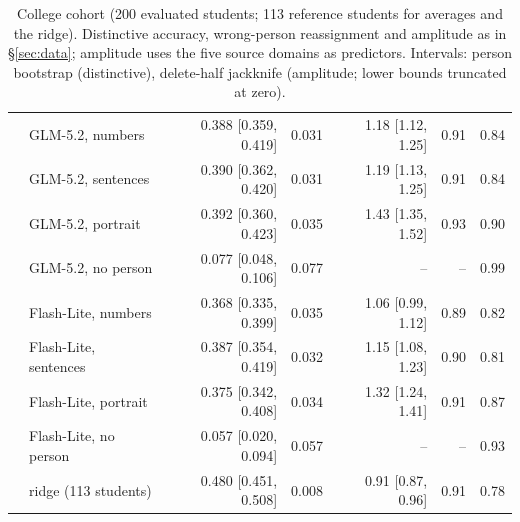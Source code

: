 \begin{table}[tp]
\begin{tabular}{@{}llrrrrr@{}}
 & GLM-5.2, numbers & 0.388 [0.359, 0.419] & 0.031 & 1.18 [1.12, 1.25] & 0.91 & 0.84 \\
 & GLM-5.2, sentences & 0.390 [0.362, 0.420] & 0.031 & 1.19 [1.13, 1.25] & 0.91 & 0.84 \\
 & GLM-5.2, portrait & 0.392 [0.360, 0.423] & 0.035 & 1.43 [1.35, 1.52] & 0.93 & 0.90 \\
 & GLM-5.2, no person & 0.077 [0.048, 0.106] & 0.077 & -- & -- & 0.99 \\
 & Flash-Lite, numbers & 0.368 [0.335, 0.399] & 0.035 & 1.06 [0.99, 1.12] & 0.89 & 0.82 \\
 & Flash-Lite, sentences & 0.387 [0.354, 0.419] & 0.032 & 1.15 [1.08, 1.23] & 0.90 & 0.81 \\
 & Flash-Lite, portrait & 0.375 [0.342, 0.408] & 0.034 & 1.32 [1.24, 1.41] & 0.91 & 0.87 \\
 & Flash-Lite, no person & 0.057 [0.020, 0.094] & 0.057 & -- & -- & 0.93 \\
 & ridge (113 students) & 0.480 [0.451, 0.508] & 0.008 & 0.91 [0.87, 0.96] & 0.91 & 0.78 \\
\bottomrule\end{tabular}
\caption{College cohort (200 evaluated students; 113 reference students for averages and the ridge). Distinctive accuracy, wrong-person reassignment and amplitude as in \S\ref{sec:data}; amplitude uses the five source domains as predictors. Intervals: person bootstrap (distinctive), delete-half jackknife (amplitude; lower bounds truncated at zero).}
\label{tab:bessi}\end{table}
